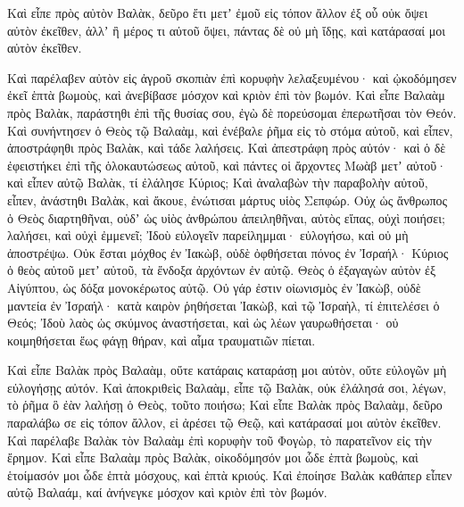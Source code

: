 {Καὶ εἶπε πρὸς αὐτὸν Βαλὰκ, δεῦρο ἔτι μετʼ ἐμοῦ εἰς τόπον ἄλλον ἐξ οὗ οὐκ ὄψει αὐτὸν ἐκεῖθεν, ἀλλʼ ἢ μέρος τι αὐτοῦ ὄψει, πάντας δὲ οὐ μὴ ἴδῃς, καὶ κατάρασαί μοι αὐτὸν ἐκεῖθεν.
\par }{\PP {}Καὶ παρέλαβεν αὐτὸν εἰς ἀγροῦ σκοπιὰν ἐπὶ κορυφὴν λελαξευμένου· καὶ ᾠκοδόμησεν ἐκεῖ ἑπτὰ βωμοὺς, καὶ ἀνεβίβασε μόσχον καὶ κριὸν ἐπὶ τὸν βωμόν.
Καὶ εἶπε Βαλαὰμ πρὸς Βαλὰκ, παράστηθι ἐπὶ τῆς θυσίας σου, ἐγὼ δὲ πορεύσομαι ἐπερωτῆσαι τὸν Θεόν.
Καὶ συνήντησεν ὁ Θεὸς τῷ Βαλαὰμ, καὶ ἐνέβαλε ῥῆμα εἰς τὸ στόμα αὐτοῦ, καὶ εἶπεν, ἀποστράφηθι πρὸς Βαλὰκ, καὶ τάδε λαλήσεις.
Καὶ ἀπεστράφη πρὸς αὐτόν· καὶ ὁ δὲ ἐφειστήκει ἐπὶ τῆς ὁλοκαυτώσεως αὐτοῦ, καὶ πάντες οἱ ἄρχοντες Μωὰβ μετʼ αὐτοῦ· καὶ εἶπεν αὐτῷ Βαλὰκ, τί ἐλάλησε Κύριος;
Καὶ ἀναλαβὼν τὴν παραβολὴν αὐτοῦ, εἶπεν, ἀνάστηθι Βαλὰκ, καὶ ἄκουε, ἐνώτισαι μάρτυς υἱὸς Σεπφώρ.
Οὐχ ὡς ἄνθρωπος ὁ Θεὸς διαρτηθῆναι, οὐδʼ ὡς υἱὸς ἀνθρώπου ἀπειληθῆναι, αὐτὸς εἴπας, οὐχὶ ποιήσει; λαλήσει, καὶ οὐχὶ ἐμμενεῖ;
Ἰδοὺ εὐλογεῖν παρείλημμαι· εὐλογήσω, καὶ οὐ μὴ ἀποστρέψω.
Οὐκ ἔσται μόχθος ἐν Ἰακὼβ, οὐδὲ ὀφθήσεται πόνος ἐν Ἰσραήλ· Κύριος ὁ θεὸς αὐτοῦ μετʼ αὐτοῦ, τὰ ἔνδοξα ἀρχόντων ἐν αὐτῷ.
Θεὸς ὁ ἐξαγαγὼν αὐτὸν ἐξ Αἰγύπτου, ὡς δόξα μονοκέρωτος αὐτῷ.
Οὐ γάρ ἐστιν οἰωνισμὸς ἐν Ἰακὼβ, οὐδὲ μαντεία ἐν Ἰσραήλ· κατὰ καιρὸν ῥηθήσεται Ἰακὼβ, καὶ τῷ Ἰσραὴλ, τί ἐπιτελέσει ὁ Θεός;
Ἰδοὺ λαὸς ὡς σκύμνος ἀναστήσεται, καὶ ὡς λέων γαυρωθήσεται· οὐ κοιμηθήσεται ἕως φάγῃ θήραν, καὶ αἷμα τραυματιῶν πίεται.
\par }{\PP {}Καὶ εἶπε Βαλὰκ πρὸς Βαλαὰμ, οὔτε κατάραις καταράσῃ μοι αὐτὸν, οὔτε εὐλογῶν μὴ εὐλογήσῃς αὐτόν.
Καὶ ἀποκριθεὶς Βαλαὰμ, εἶπε τῷ Βαλὰκ, οὐκ ἐλάλησά σοι, λέγων, τὸ ῥῆμα ὃ ἐὰν λαλήσῃ ὁ Θεὸς, τοῦτο ποιήσω;
Καὶ εἶπε Βαλὰκ πρὸς Βαλαὰμ, δεῦρο παραλάβω σε εἰς τόπον ἄλλον, εἰ ἀρέσει τῷ Θεῷ, καὶ κατάρασαί μοι αὐτὸν ἐκεῖθεν.
Καὶ παρέλαβε Βαλὰκ τὸν Βαλαὰμ ἐπὶ κορυφὴν τοῦ Φογὼρ, τὸ παρατεῖνον εἰς τὴν ἔρημον.
Καὶ εἶπε Βαλαὰμ πρὸς Βαλὰκ, οἰκοδόμησόν μοι ὧδε ἑπτὰ βωμοὺς, καὶ ἑτοίμασόν μοι ὧδε ἑπτὰ μόσχους, καὶ ἑπτὰ κριούς.
Καὶ ἐποίησε Βαλὰκ καθάπερ εἶπεν αὐτῷ Βαλαάμ, καί ἀνήνεγκε μόσχον καὶ κριὸν ἐπὶ τὸν βωμόν.

}
